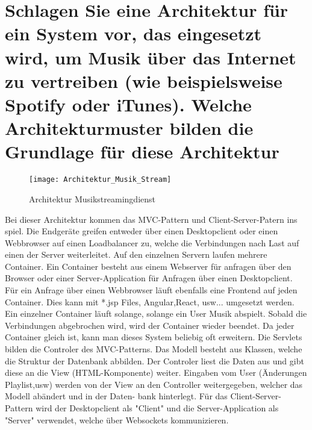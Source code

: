 \documentclass[12pt]{article}
\begin{document}
\section{Schlagen Sie eine Architektur für ein System vor, das eingesetzt wird, um Musik über das Internet zu
vertreiben (wie beispielsweise Spotify oder iTunes). Welche Architekturmuster bilden die Grundlage für
diese Architektur}
\begin{figure}[h]
\begin{center}
\texttt{[image: Architektur\_Musik\_Stream]}
\caption{Architektur Musikstreamingdienst}
\end{center}
\end{figure}
Bei dieser Architektur kommen das MVC-Pattern und Client-Server-Patern ins spiel. Die Endgeräte greifen entweder über einen Desktopclient oder einen Webbrowser auf einen Loadbalancer zu, welche die Verbindungen nach Last auf einen der Server weiterleitet. Auf den einzelnen Servern laufen mehrere Container. Ein Container besteht aus einem Webserver für anfragen über den Browser oder einer Server-Application für Anfragen über einen Desktopclient. Für ein Anfrage über einen Webbrowser läuft ebenfalls eine Frontend auf jeden Container. Dies kann mit *.jsp Files, Angular,React, usw... umgesetzt werden. Ein einzelner Container läuft solange, solange ein User Musik abspielt. Sobald die Verbindungen abgebrochen wird, wird der Container wieder beendet. Da jeder Container gleich ist, kann man dieses System beliebig oft erweitern. Die Servlets bilden die Controler des MVC-Patterns. Das Modell besteht aus Klassen, welche die Struktur der Datenbank abbilden. Der Controler liest die Daten aus und gibt diese an die View (HTML-Komponente) weiter. Eingaben vom User (Änderungen Playlist,usw) werden von der View an den Controller weitergegeben, welcher das Modell abändert und in der Daten- bank hinterlegt.
Für das Client-Server-Pattern wird der Desktopclient als "Client" und die Server-Application als "Server" verwendet, welche über Websockets kommunizieren.
\end{document}
